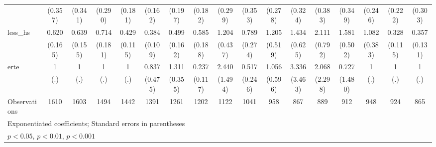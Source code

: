 {\begin{tabular}{l*{16}{c}}
                    &     (0.357)         &     (0.341)         &     (0.290)         &     (0.181)         &     (0.162)         &     (0.197)         &     (0.182)         &     (0.299)         &     (0.353)         &     (0.278)         &     (0.324)         &     (0.383)         &     (0.349)         &     (0.246)         &     (0.222)         &     (0.303)         \\
[1em]
less\_hs             &       0.620         &       0.639         &       0.714         &       0.429\sym{**} &       0.384\sym{***}&       0.499\sym{*}  &       0.585         &       1.204         &       0.789         &       1.205         &       1.434         &       2.111\sym{*}  &       1.581         &       1.082         &       0.328\sym{**} &       0.357\sym{**} \\
                    &     (0.165)         &     (0.155)         &     (0.181)         &     (0.115)         &     (0.109)         &     (0.162)         &     (0.188)         &     (0.437)         &     (0.274)         &     (0.519)         &     (0.625)         &     (0.792)         &     (0.502)         &     (0.383)         &     (0.115)         &     (0.131)         \\
[1em]
erte                &           1         &           1         &           1         &           1         &       0.837         &       1.311         &       0.237\sym{**} &       2.440         &       0.517         &       1.056         &       3.336         &       2.068         &       0.727         &           1         &           1         &           1         \\
                    &         (.)         &         (.)         &         (.)         &         (.)         &     (0.475)         &     (0.355)         &     (0.117)         &     (1.494)         &     (0.246)         &     (0.596)         &     (3.463)         &     (2.298)         &     (1.480)         &         (.)         &         (.)         &         (.)         \\
\hline
Observations        &        1610         &        1603         &        1494         &        1442         &        1391         &        1261         &        1202         &        1122         &        1041         &         958         &         867         &         889         &         912         &         948         &         924         &         865         \\
\hline\hline
\multicolumn{17}{l}{\footnotesize Exponentiated coefficients; Standard errors in parentheses}\\
\multicolumn{17}{l}{\footnotesize \sym{*} \(p<0.05\), \sym{**} \(p<0.01\), \sym{***} \(p<0.001\)}\\
\end{tabular}
}
